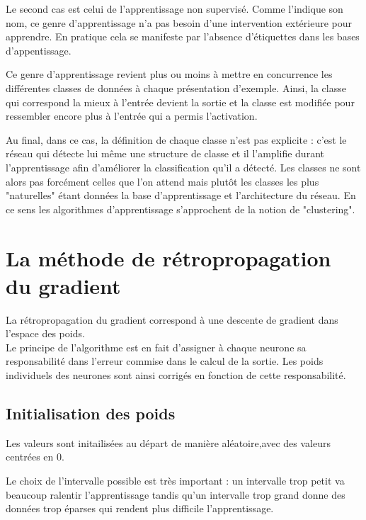 \documentclass[a4paper,oneside]{report}
\begin{document}
                Le second cas est celui de l'apprentissage non supervisé. Comme l'indique son nom, ce 
genre d'apprentissage n'a pas besoin d'une intervention extérieure pour apprendre. En 
pratique cela se manifeste 
par l'absence d'étiquettes dans les bases d'appentissage.

                Ce genre d'apprentissage revient plus ou moins à mettre en concurrence les différentes 
classes de données à chaque présentation d'exemple. Ainsi, la classe qui correspond la 
mieux à l'entrée devient 
la sortie et la classe est modifiée pour ressembler encore plus à l'entrée qui a permis l'activation.

                Au final, dans ce cas, la définition de chaque classe n'est pas explicite : c'est le 
réseau qui détecte lui même une structure de classe et il l'amplifie durant 
l'apprentissage afin d'améliorer la 
classification qu'il a détecté. Les classes ne sont alors pas forcément celles que l'on attend mais 
plutôt les classes les plus "naturelles" étant données la base d'apprentissage et l'architecture du 
réseau. En ce sens les algorithmes d'apprentissage s'approchent de la notion de "clustering".


            \section{La méthode de rétropropagation du gradient}

                La rétropropagation du gradient correspond à une descente de gradient dans l'espace 
des poids.\\

                Le principe de l'algorithme est en fait d'assigner à chaque neurone sa responsabilité 
dans l'erreur commise dans le calcul de la sortie. Les poids individuels des neurones 
sont ainsi corrigés en 
fonction de cette responsabilité.


                \subsection{Initialisation des poids}

                    Les valeurs sont initailisées au départ de manière aléatoire,avec des valeurs 
centrées en 0.

                    Le choix de l'intervalle possible est très important : un intervalle trop petit va 
beaucoup ralentir l'apprentissage tandis qu'un intervalle trop grand donne des 
données trop éparses qui rendent 
plus difficile l'apprentissage.
\end{document}
